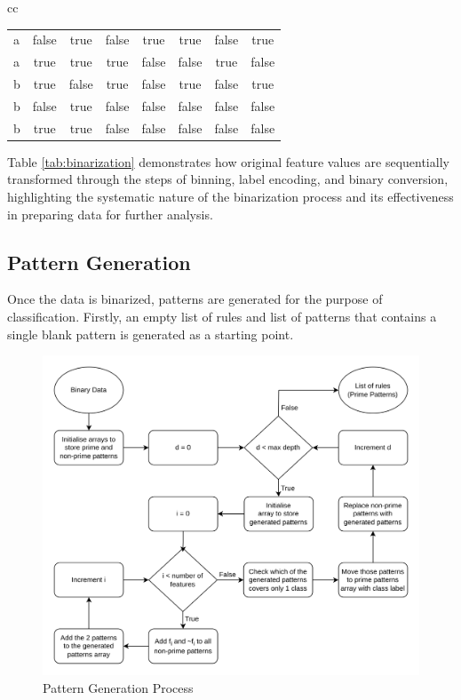 \documentclass[pdflatex,sn-mathphys-num]{sn-jnl}%
\let\oldcaption\caption
\renewcommand{\caption}[1]{\oldcaption{\centering #1}}
\theoremstyle{thmstyleone}%
\theoremstyle{thmstyletwo}%
\theoremstyle{thmstylethree}%
\begin{document}
\begin{table}[ht!]
\begin{tabular}{cc}
{\begin{tabular}{|l|c|c|c|c|c|c|c|}
        a          & false          & true           & false          & true           & true        & false          & true           \\
        a          & true           & true           & true           & false          & false       & true           & false          \\
        b          & true           & false          & true           & false          & true        & false          & true           \\
        b          & false          & true           & false          & false          & false       & false          & false          \\
        b          & true           & true           & false          & false          & false       & false          & false          \\ \hline
      \end{tabular}
    }
  \end{tabular}
\end{table}



Table \ref{tab:binarization} demonstrates how original feature values are sequentially transformed through the steps of binning, label encoding, and binary conversion, highlighting the systematic nature of the binarization process and its effectiveness in preparing data for further analysis.

\subsection{Pattern Generation}

Once the data is binarized, patterns are generated for the purpose of classification.
Firstly, an empty list of rules and list of patterns that contains a single blank pattern is generated as a starting point.

\begin{figure}[ht!]
  \centering
  \includegraphics[width=0.8\linewidth]{Pattern.drawio.png}
  \caption{Pattern Generation Process}
  \label{fig:PatternGeneration}
\end{figure}
\end{document}
